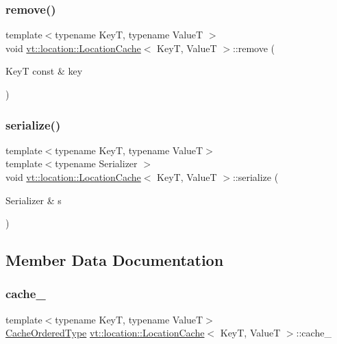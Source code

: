 \subsubsection{\texorpdfstring{remove()}{remove()}}
{\footnotesize\ttfamily template$<$typename KeyT, typename ValueT $>$ \\
void \hyperlink{structvt_1_1location_1_1_location_cache}{vt\+::location\+::\+Location\+Cache}$<$ KeyT, ValueT $>$\+::remove (\begin{DoxyParamCaption}\item[{KeyT const \&}]{key }\end{DoxyParamCaption})}

\mbox{\label{structvt_1_1location_1_1_location_cache_ac40038e01d47301b146869f0199d2a0a}} 
\subsubsection{\texorpdfstring{serialize()}{serialize()}}
{\footnotesize\ttfamily template$<$typename KeyT, typename ValueT$>$ \\
template$<$typename Serializer $>$ \\
void \hyperlink{structvt_1_1location_1_1_location_cache}{vt\+::location\+::\+Location\+Cache}$<$ KeyT, ValueT $>$\+::serialize (\begin{DoxyParamCaption}\item[{Serializer \&}]{s }\end{DoxyParamCaption})\hspace{0.3cm}{\ttfamily [inline]}}



\subsection{Member Data Documentation}
\mbox{\label{structvt_1_1location_1_1_location_cache_a5bc8fbc8010517ed45b022633af26de9}} 
\subsubsection{\texorpdfstring{cache\+\_\+}{cache\_}}
{\footnotesize\ttfamily template$<$typename KeyT, typename ValueT$>$ \\
\hyperlink{structvt_1_1location_1_1_location_cache_aee11ea8af838d172e1834a9d0293b28d}{Cache\+Ordered\+Type} \hyperlink{structvt_1_1location_1_1_location_cache}{vt\+::location\+::\+Location\+Cache}$<$ KeyT, ValueT $>$\+::cache\+\_\+\hspace{0.3cm}{\ttfamily [private]}}

